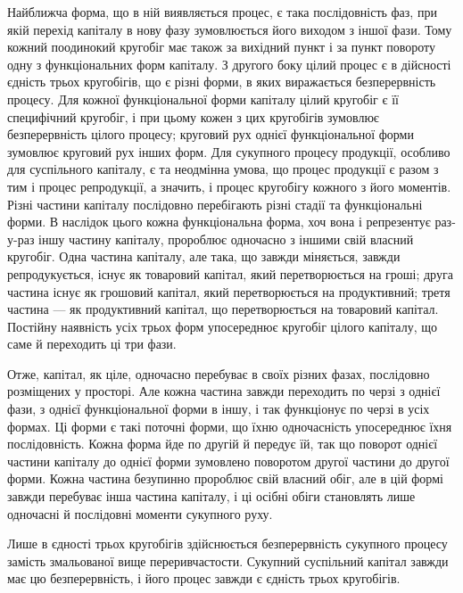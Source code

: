 Найближча форма, що в ній виявляється процес, є така послідовність
фаз, при якій перехід капіталу в нову фазу зумовлюється його виходом
з іншої фази. Тому кожний поодинокий кругобіг має також за вихідний
пункт і за пункт повороту одну з функціональних форм капіталу.
З другого боку цілий процес є в дійсності єдність трьох кругобігів, що є
різні форми, в яких виражається безперервність процесу. Для кожної
функціональної форми капіталу цілий кругобіг є її специфічний кругобіг,
і при цьому кожен з цих кругобігів зумовлює безперервність цілого процесу;
круговий рух однієї функціональної форми зумовлює круговий рух
інших форм. Для сукупного процесу продукції, особливо для суспільного
капіталу, є та неодмінна умова, що процес продукції є разом з
тим і процес репродукції, а значить, і процес кругобігу кожного з його
моментів. Різні частини капіталу послідовно перебігають різні стадії та
функціональні форми. В наслідок цього кожна функціональна форма, хоч
вона і репрезентує раз-у-раз іншу частину капіталу, пророблює одночасно
з іншими свій власний кругобіг. Одна частина капіталу, але
така, що завжди міняється, завжди репродукується, існує як товаровий
капітал, який перетворюється на гроші; друга частина існує як грошовий
капітал, який перетворюється на продуктивний; третя частина —
як продуктивний капітал, що перетворюється на товаровий капітал.
Постійну наявність усіх трьох форм упосереднює кругобіг цілого капіталу,
що саме й переходить ці три фази.

Отже, капітал, як ціле, одночасно перебуває в своїх різних фазах,
послідовно розміщених у просторі. Але кожна частина завжди переходить
по черзі з однієї фази, з однієї функціональної форми в іншу,
і так функціонує по черзі в усіх формах. Ці форми є такі поточні форми,
що їхню одночасність упосереднює їхня послідовність. Кожна форма
йде по другій й передує їй, так що поворот однієї частини капіталу
до однієї форми зумовлено поворотом другої частини до другої форми.
Кожна частина безупинно пророблює свій власний обіг, але в цій
формі завжди перебуває інша частина капіталу, і ці осібні обіги становлять
лише одночасні й послідовні моменти сукупного руху.

Лише в єдності трьох кругобігів здійснюється безперервність сукупного
процесу замість змальованої вище переривчастости. Сукупний
суспільний капітал завжди має цю безперервність, і його процес завжди
є єдність трьох кругобігів.
